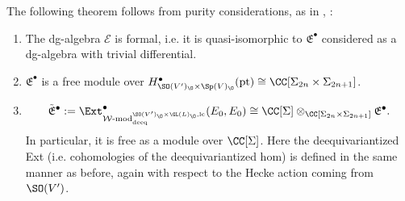 \documentclass[11pt]{article}
\begin{document}
The following theorem follows from purity considerations, as in \cite[Lemmas 3.3.1, 3.3.2, 3.3.3]{BFKT}, \cite[§2.7]{BFT2}:
\begin{theorem}\label{thm: purity}
    \begin{enumerate}
        \item The dg-algebra $\mathscr{E}$ is formal, i.e. it is quasi-isomorphic to $\mathfrak{E}^\bullet$ considered as a dg-algebra with trivial differential.
        \item $\mathfrak{E}^\bullet$ is a free module over $H^\bullet_{\SO(V')_\O\times \Sp(V)_\O}(\mathrm{pt})\cong \CC[\Sigma_{2n}\times \Sigma_{2n+1}]$.
        \item $$\tilde{\mathfrak{E}}^\bullet:=\Ext^\bullet_{\operatorname{\mathcal{W}-\mathrm{mod}}^{\SO(V')_\O\times \GL(L)_\O, \mathrm{lc}}_{\mathrm{deeq}}}(E_0, E_0)\cong \CC[\Sigma]\otimes_{\CC[\Sigma_{2n}\times \Sigma_{2n+1}]}\mathfrak{E}^\bullet.$$ In particular, it is free as a module over $\CC[\Sigma]$. Here the deequivariantized Ext (i.e. cohomologies of the deequivariantized hom) is defined in the same manner as before, again with respect to the Hecke action coming from $\SO(V')$.
    \end{enumerate}
\end{theorem}
\end{document}
